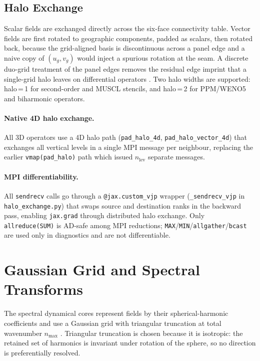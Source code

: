 \documentclass[11pt,twoside]{report}
\begin{document}
\subsection{Halo Exchange}

Scalar fields are exchanged directly across the six-face connectivity table.
Vector fields are first rotated to geographic components, padded as scalars,
then rotated back, because the grid-aligned basis is discontinuous across a
panel edge and a naive copy of $(u_g,v_g)$ would inject a spurious rotation at
the seam.  A discrete duo-grid treatment of the panel edges removes the residual
edge imprint that a single-grid halo leaves on differential operators
\citep{Mouallem2023}.  Two halo widths are supported: halo\,=\,1 for second-order
and MUSCL stencils, and halo\,=\,2 for PPM/WENO5 and biharmonic operators.

\paragraph{Native 4D halo exchange.}
All 3D operators use a 4D halo path (\texttt{pad\_halo\_4d},
\texttt{pad\_halo\_vector\_4d}) that exchanges all vertical levels in a
single MPI message per neighbour, replacing the earlier
\texttt{vmap(pad\_halo)} path which issued $n_{\mathrm{lev}}$ separate
messages.

\paragraph{MPI differentiability.}
All \texttt{sendrecv} calls go through a \texttt{@jax.custom\_vjp}
wrapper (\texttt{\_sendrecv\_vjp} in \texttt{halo\_exchange.py}) that
swaps source and destination ranks in the backward pass, enabling
\texttt{jax.grad} through distributed halo exchange.  Only
\texttt{allreduce(SUM)} is AD-safe among MPI reductions;
\texttt{MAX}/\texttt{MIN}/\texttt{allgather}/\texttt{bcast} are used
only in diagnostics and are not differentiable.


\section{Gaussian Grid and Spectral Transforms}
\label{sec:spectral-grid}

The spectral dynamical cores represent fields by their spherical-harmonic
coefficients and use a Gaussian grid with triangular truncation at total
wavenumber $n_{\max}$ \citep{Bourke1972,HoskinsSimmons1975}.  Triangular
truncation is chosen because it is isotropic: the retained set of harmonics is
invariant under rotation of the sphere, so no direction is preferentially
resolved.
\end{document}
